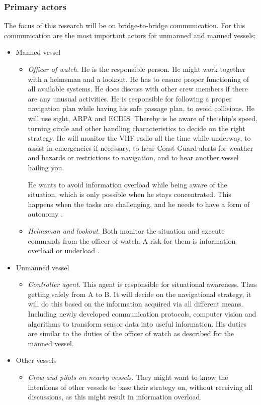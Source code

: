 \subsubsection{Primary actors}
The focus of this research will be on bridge-to-bridge communication. For this communication are the most important actors for unmanned and manned vessels:
\begin{itemize}
	\item Manned vessel
	\begin{itemize}
		\item \emph{Officer of watch}. He is the responsible person. He might work together with a helmsman and a lookout. He has to ensure proper functioning of all available systems. He does discuss with other crew members if there are any unusual activities. He is responsible for following a proper navigation plan while having his safe passage plan, to avoid collisions. He will use sight, \acf{ARPA} and \acf{ECDIS}. Thereby is he aware of the ship's speed, turning circle and other handling characteristics to decide on the right strategy. He will monitor the \ac{VHF} radio all the time while underway, to assist in emergencies if necessary, to hear Coast Guard alerts for weather and hazards or restrictions to navigation, and to hear another vessel hailing you.
		
		He wants to avoid information overload while being aware of the situation, which is only possible when he stays concentrated. This happens when the tasks are challenging, and he needs to have a form of autonomy \cite{Porathe2014}.
		
		\item \emph{Helmsman and lookout}. Both monitor the situation and execute commands from the officer of watch. A risk for them is information overload or underload \cite{Neerincx2008}.
	\end{itemize}
	
	\item Unmanned vessel
	\begin{itemize}
		\item \emph{Controller agent}. This agent is responsible for situational awareness. Thus getting safely from A to B. It will decide on the navigational strategy, it will do this based on the information acquired via all different means. Including newly developed communication protocols, computer vision and algorithms to transform sensor data into useful information. His duties are similar to the duties of the officer of watch as described for the manned vessel.
	\end{itemize}
	
	\item Other vessels
	\begin{itemize}
		\item \emph{Crew and pilots on nearby vessels}. They might want to know the intentions of other vessels to base their strategy on, without receiving all discussions, as this might result in information overload.
	\end{itemize}
	
\end{itemize}

